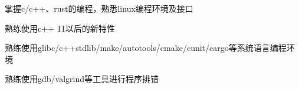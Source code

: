   \item 掌握c/c++、rust的编程，熟悉linux编程环境及接口
  \item 熟练使用c++ 11以后的新特性
  \item 熟练使用glibc/c++stdlib/make/autotools/cmake/cunit/cargo等系统语言编程环境
  \item 熟练使用gdb/valgrind等工具进行程序排错
